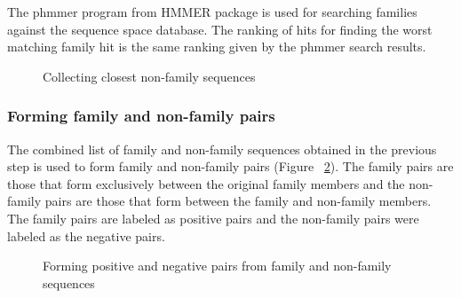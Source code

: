 \documentclass{article}
\begin{document}
			The phmmer program from HMMER package \citep{eddy1992hmmer} is used for searching families against the sequence space database. The ranking of hits for finding the worst matching family hit is the same ranking given by the phmmer search results. 
			\begin{figure}
				\caption{Collecting closest non-family sequences}
				\label{fig:collecting_non_fam_seqs}
			\end{figure}
			
			\subsubsection{Forming family and non-family pairs}
			The combined list of family and non-family sequences obtained in the previous step is used to form family and non-family pairs (Figure ~\ref{fig:forming_pairs}). The family pairs are those that form exclusively between the original family members and the non-family pairs are those that form between the family and non-family members. The family pairs are labeled as positive pairs and the non-family pairs were labeled as the negative pairs.
			
			\begin{figure}
				\caption{Forming positive and negative pairs from family and non-family sequences}
				\label{fig:forming_pairs}
			\end{figure}
			
\end{document}
